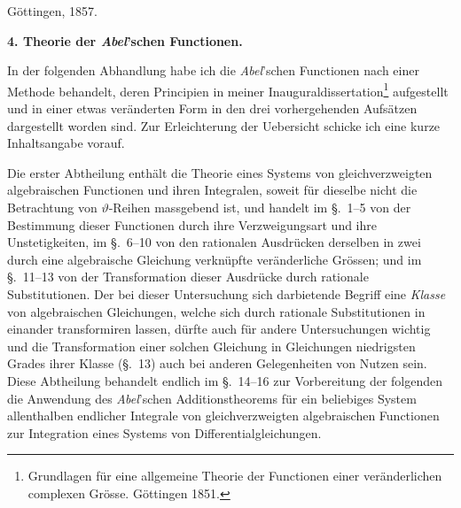 \documentclass[a4paper,12pt,leqno]{article}
\begin{document}
G\"{o}ttingen, 1857.

\begin{center}
\large\bfseries
4.  Theorie der \emph{Abel}'schen Functionen.
\end{center}

In der folgenden Abhandlung habe ich die \emph{Abel}'schen
Functionen nach einer Methode behandelt, deren Principien in
meiner Inauguraldissertation\footnote{Grundlagen f\"{u}r eine
allgemeine Theorie der Functionen einer ver\"{a}nderlichen
complexen Gr\"{o}sse.  G\"{o}ttingen 1851.}
aufgestellt und in einer etwas ver\"{a}nderten Form in den drei
vorhergehenden Aufs\"{a}tzen dargestellt worden sind.  Zur
Erleichterung der Uebersicht schicke ich eine kurze Inhaltsangabe
vorauf.

Die erster Abtheilung enth\"{a}lt die Theorie eines Systems von
gleichverzweigten algebraischen Functionen und ihren Integralen,
soweit f\"{u}r dieselbe nicht die Betrachtung von
$\vartheta$-Reihen massgebend ist, und handelt im \S.~1--5 von
der Bestimmung dieser Functionen durch ihre Verzweigungsart und
ihre Unstetigkeiten, im \S.~6--10 von den rationalen
Ausdr\"{u}cken derselben in zwei durch eine algebraische
Gleichung verkn\"{u}pfte ver\"{a}nderliche Gr\"{o}ssen; und im
\S.~11--13 von der Transformation dieser Ausdr\"{u}cke durch
rationale Substitutionen.  Der bei dieser Untersuchung sich
darbietende Begriff eine \emph{Klasse} von algebraischen
Gleichungen, welche sich durch rationale Substitutionen in
einander transformiren lassen, d\"{u}rfte auch f\"{u}r andere
Untersuchungen wichtig und die Transformation einer solchen
Gleichung in Gleichungen niedrigsten Grades ihrer Klasse (\S.~13)
auch bei anderen Gelegenheiten von Nutzen sein.  Diese Abtheilung
behandelt endlich im \S.~14--16 zur Vorbereitung der folgenden
die Anwendung des \emph{Abel}'schen Additionstheorems f\"{u}r
ein beliebiges System allenthalben endlicher Integrale von
gleichverzweigten algebraischen Functionen zur Integration eines
Systems von Differentialgleichungen.
\end{document}
